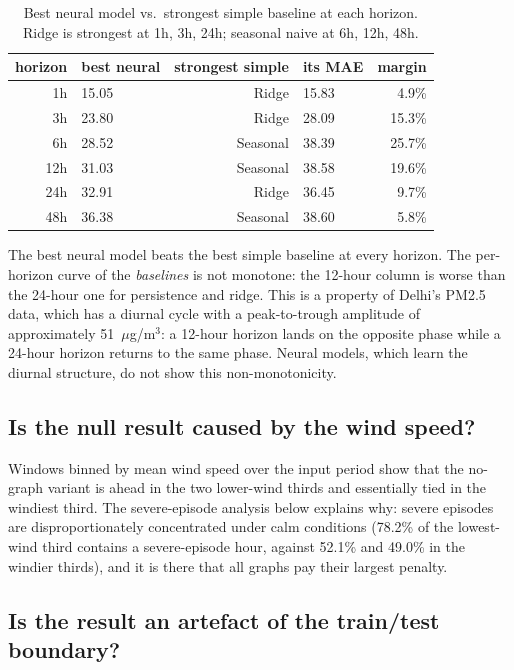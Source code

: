 \documentclass[11pt,a4paper]{article}
\begin{document}
\begin{table}[htbp]
\centering
\caption{Best neural model vs.\ strongest simple baseline at each horizon.
Ridge is strongest at 1h, 3h, 24h; seasonal naive at 6h, 12h, 48h.}
\begin{tabular}{rlrlr}
\toprule
horizon & best neural & strongest simple & its MAE & margin \\
\midrule
1h  & 15.05 & Ridge      & 15.83 & 4.9\% \\
3h  & 23.80 & Ridge      & 28.09 & 15.3\% \\
6h  & 28.52 & Seasonal   & 38.39 & 25.7\% \\
12h & 31.03 & Seasonal   & 38.58 & 19.6\% \\
24h & 32.91 & Ridge      & 36.45 & 9.7\% \\
48h & 36.38 & Seasonal   & 38.60 & 5.8\% \\
\bottomrule
\end{tabular}
\end{table}

The best neural model beats the best simple baseline at every horizon.  The
per-horizon curve of the \emph{baselines} is not monotone: the 12-hour column
is worse than the 24-hour one for persistence and ridge.  This is a property
of Delhi's PM2.5 data, which has a diurnal cycle with a peak-to-trough
amplitude of approximately 51~$\mu$g/m$^3$: a 12-hour horizon lands on the
opposite phase while a 24-hour horizon returns to the same phase.  Neural
models, which learn the diurnal structure, do not show this non-monotonicity.

\subsection{Is the null result caused by the wind speed?}

Windows binned by mean wind speed over the input period show that the no-graph
variant is ahead in the two lower-wind thirds and essentially tied in the
windiest third.  The severe-episode analysis below explains why: severe
episodes are disproportionately concentrated under calm conditions (78.2\% of
the lowest-wind third contains a severe-episode hour, against 52.1\% and 49.0\%
in the windier thirds), and it is there that all graphs pay their largest penalty.

\subsection{Is the result an artefact of the train/test boundary?}
\end{document}
